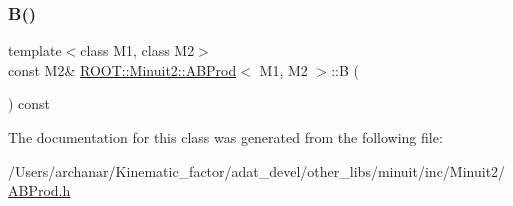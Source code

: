 \mbox{\label{classROOT_1_1Minuit2_1_1ABProd_a526658028b2971b0dbf6f1b78b05d6a7}} 
\subsubsection{\texorpdfstring{B()}{B()}\hspace{0.1cm}{\footnotesize\ttfamily [2/2]}}
{\footnotesize\ttfamily template$<$class M1, class M2$>$ \\
const M2\& \mbox{\hyperlink{classROOT_1_1Minuit2_1_1ABProd}{R\+O\+O\+T\+::\+Minuit2\+::\+A\+B\+Prod}}$<$ M1, M2 $>$\+::B (\begin{DoxyParamCaption}{ }\end{DoxyParamCaption}) const\hspace{0.3cm}{\ttfamily [inline]}}



The documentation for this class was generated from the following file\+:\begin{DoxyCompactItemize}
\item 
/\+Users/archanar/\+Kinematic\+\_\+factor/adat\+\_\+devel/other\+\_\+libs/minuit/inc/\+Minuit2/\mbox{\hyperlink{other__libs_2minuit_2inc_2Minuit2_2ABProd_8h}{A\+B\+Prod.\+h}}\end{DoxyCompactItemize}
